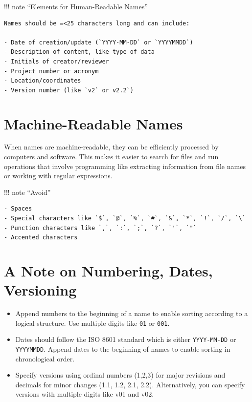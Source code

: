 \documentclass[
  letterpaper,
  DIV=11,
  numbers=noendperiod]{scrreprt}
\begin{document}
!!! note ``Elements for Human-Readable Names''

\begin{verbatim}
Names should be =<25 characters long and can include:

- Date of creation/update (`YYYY-MM-DD` or `YYYYMMDD`)
- Description of content, like type of data
- Initials of creator/reviewer
- Project number or acronym
- Location/coordinates
- Version number (like `v2` or v2.2`)
\end{verbatim}

\hypertarget{machine-readable-names}{%
\section*{Machine-Readable Names}\label{machine-readable-names}}


When names are machine-readable, they can be efficiently processed by
computers and software. This makes it easier to search for files and run
operations that involve programming like extracting information from
file names or working with regular expressions.

!!! note ``Avoid''

\begin{verbatim}
- Spaces
- Special characters like `$`, `@`, `%`, `#`, `&`, `*`, `!`, `/`, `\`
- Punction characters like `,`, `:`, `;`, `?`, `'`, `"`
- Accented characters
\end{verbatim}

\hypertarget{a-note-on-numbering-dates-versioning}{%
\section*{A Note on Numbering, Dates,
Versioning}\label{a-note-on-numbering-dates-versioning}}


\begin{itemize}
\item
  Append numbers to the beginning of a name to enable sorting according
  to a logical structure. Use multiple digits like \texttt{01} or
  \texttt{001}.
\item
  Dates should follow the ISO 8601 standard which is either
  \texttt{YYYY-MM-DD} or \texttt{YYYYMMDD}. Append dates to the
  beginning of names to enable sorting in chronological order.
\item
  Specify versions using ordinal numbers (1,2,3) for major revisions and
  decimals for minor changes (1.1, 1.2, 2.1, 2.2). Alternatively, you
  can specify versions with multiple digits like v01 and v02.
\end{itemize}
\end{document}
